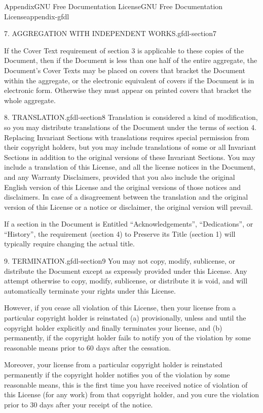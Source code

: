 \documentclass[oneside,10pt,]{book}
\numberwithin{equation}{section}
\begin{document}
\begin{appendixptx}{Appendix}{GNU Free Documentation License}{}{GNU Free Documentation License}{}{}{appendix-gfdl}
\begin{paragraphs}{7. AGGREGATION WITH INDEPENDENT WORKS.}{gfdl-section7}
\par
If the Cover Text requirement of section 3 is applicable to these copies of the Document, then if the Document is less than one half of the entire aggregate, the Document's Cover Texts may be placed on covers that bracket the Document within the aggregate, or the electronic equivalent of covers if the Document is in electronic form. Otherwise they must appear on printed covers that bracket the whole aggregate.%
\end{paragraphs}%
\begin{paragraphs}{8. TRANSLATION.}{gfdl-section8}%
Translation is considered a kind of modification, so you may distribute translations of the Document under the terms of section 4. Replacing Invariant Sections with translations requires special permission from their copyright holders, but you may include translations of some or all Invariant Sections in addition to the original versions of these Invariant Sections. You may include a translation of this License, and all the license notices in the Document, and any Warranty Disclaimers, provided that you also include the original English version of this License and the original versions of those notices and disclaimers. In case of a disagreement between the translation and the original version of this License or a notice or disclaimer, the original version will prevail.%
\par
If a section in the Document is Entitled ``Acknowledgements'', ``Dedications'', or ``History'', the requirement (section 4) to Preserve its Title (section 1) will typically require changing the actual title.%
\end{paragraphs}%
\begin{paragraphs}{9. TERMINATION.}{gfdl-section9}%
You may not copy, modify, sublicense, or distribute the Document except as expressly provided under this License. Any attempt otherwise to copy, modify, sublicense, or distribute it is void, and will automatically terminate your rights under this License.%
\par
However, if you cease all violation of this License, then your license from a particular copyright holder is reinstated (a) provisionally, unless and until the copyright holder explicitly and finally terminates your license, and (b) permanently, if the copyright holder fails to notify you of the violation by some reasonable means prior to 60 days after the cessation.%
\par
Moreover, your license from a particular copyright holder is reinstated permanently if the copyright holder notifies you of the violation by some reasonable means, this is the first time you have received notice of violation of this License (for any work) from that copyright holder, and you cure the violation prior to 30 days after your receipt of the notice.%

\end{paragraphs}
\end{appendixptx}
\end{document}
